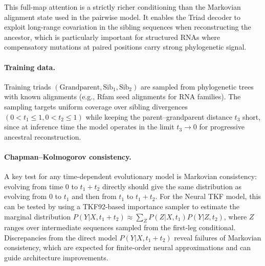 This full-map attention is a strictly richer conditioning
than the Markovian alignment state used in the pairwise model.
It enables the Triad decoder to exploit long-range covariation
in the sibling sequences when reconstructing the ancestor,
which is particularly important for structured RNAs
where compensatory mutations at paired positions carry strong phylogenetic signal.

\paragraph{Training data.}
Training triads $(\text{Grandparent}, \text{Sib}_1, \text{Sib}_2)$
are sampled from phylogenetic trees with known alignments
(e.g., Rfam seed alignments for RNA families).
The sampling targets uniform coverage over sibling divergences
$(0 < t_1 \leq 1, 0 < t_2 \leq 1)$
while keeping the parent--grandparent distance $t_3$ short,
since at inference time the model operates in the limit $t_3 \to 0$
for progressive ancestral reconstruction.

\paragraph{Chapman--Kolmogorov consistency.}
A key test for any time-dependent evolutionary model
is Markovian consistency:
evolving from time 0 to $t_1 + t_2$ directly
should give the same distribution as evolving from 0 to $t_1$
and then from $t_1$ to $t_1 + t_2$.
For the Neural TKF model, this can be tested
by using a TKF92-based importance sampler
to estimate the marginal distribution
$P(Y | X, t_1 + t_2) \approx \sum_Z P(Z | X, t_1) P(Y | Z, t_2)$,
where $Z$ ranges over intermediate sequences
sampled from the first-leg conditional.
Discrepancies from the direct model $P(Y | X, t_1 + t_2)$
reveal failures of Markovian consistency,
which are expected for finite-order neural approximations
and can guide architecture improvements.

